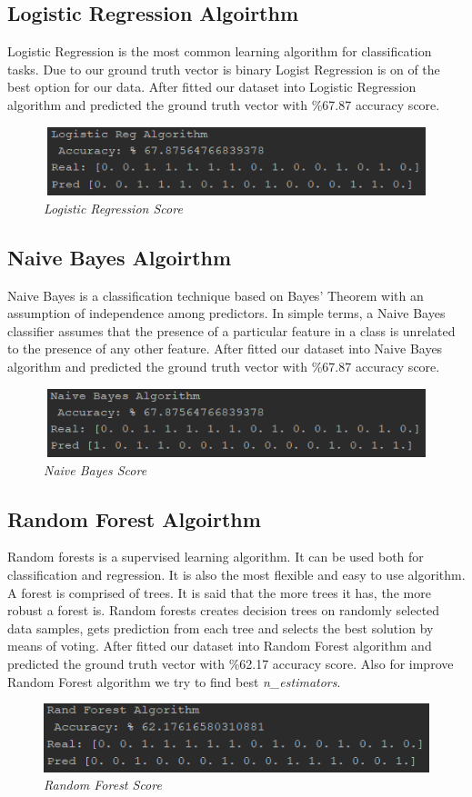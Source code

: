 \documentclass[onecolumn]{article}
\begin{document}
\subsection{Logistic Regression Algoirthm}
Logistic Regression is the most common learning algorithm for classification tasks. Due to our ground truth vector is binary Logist Regression is on of the best option for our data. After fitted our dataset into Logistic Regression algorithm and predicted the ground truth vector with \%67.87 accuracy score.
\begin{figure}[h]
\includegraphics[width=15cm, height=2cm]{Logistic.png}
\caption{\emph{Logistic Regression Score}}
\centering
\end{figure}
\subsection{Naive Bayes Algoirthm}
Naive Bayes is a classification technique based on Bayes’ Theorem with an assumption of independence among predictors. In simple terms, a Naive Bayes classifier assumes that the presence of a particular feature in a class is unrelated to the presence of any other feature. After fitted our dataset into Naive Bayes algorithm and predicted the ground truth vector with \%67.87 accuracy score.
\begin{figure}[h]
\includegraphics[width=15cm, height=2cm]{NaiveBayes.png}
\caption{\emph{Naive Bayes Score}}
\centering
\end{figure}
\subsection{Random Forest Algoirthm}
Random forests is a supervised learning algorithm. It can be used both for classification and regression. It is also the most flexible and easy to use algorithm. A forest is comprised of trees. It is said that the more trees it has, the more robust a forest is. Random forests creates decision trees on randomly selected data samples, gets prediction from each tree and selects the best solution by means of voting. After fitted our dataset into Random Forest algorithm and predicted the ground truth vector with \%62.17 accuracy score. Also for improve Random Forest algorithm we try to find best \emph{n\_estimators}.
\begin{figure}[h]
\includegraphics[width=15cm, height=2cm]{RandForest.png}
\caption{\emph{Random Forest Score}}
\centering
\end{figure}
\end{document}
